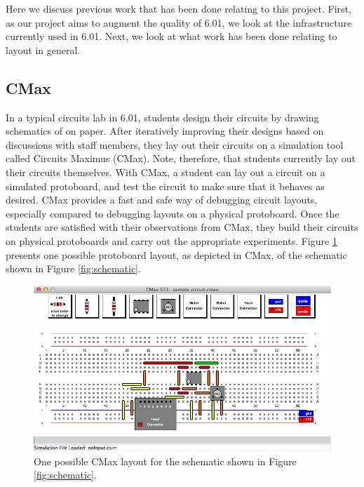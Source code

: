 Here we discuss previous work that has been done relating to this project.
First, as our project aims to augment the quality of 6.01, we look at the
infrastructure currently used in 6.01. Next, we look at what work has
been done relating to layout in general.

\subsection{CMax}

In a typical circuits lab in 6.01, students design their circuits by
drawing schematics of on paper.
After iteratively improving their designs based on discussions with staff
members, they lay out their circuits on a simulation tool called Circuits Maximus
(CMax)\cite{cmax}. Note, therefore, that students currently lay out their
circuits themselves.
With CMax, a student can lay out a circuit on a simulated protoboard, and test
the circuit to make sure that it behaves as desired.
CMax provides a fast
and safe way of debugging circuit layouts, especially compared to debugging
layouts on a physical protoboard. Once the students are satisfied with their
observations from CMax, they build their circuits on physical protoboards and
carry out the appropriate experiments. Figure \ref{fig:cmax_sample} presents one
possible protoboard layout, as depicted in CMax, of the schematic shown in
Figure \ref{fig:schematic}.

\begin{figure}
\begin{center}
\includegraphics[width=\textwidth]{Images/sample_circuit.png}
\caption[CMax]{One possible CMax layout for the schematic shown in Figure
\ref{fig:schematic}.}
\label{fig:cmax_sample}
\end{center}
\end{figure}

